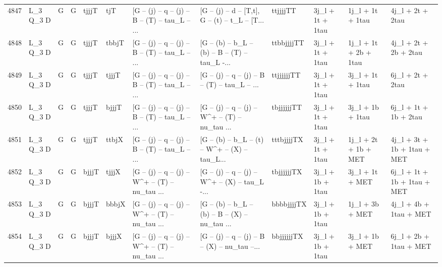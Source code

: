 \begin{tabular}{llllllllllll}
4847 &    L\_3 Q\_3 D &     G &     G &       tjjjT &         tjT &  [G -- (j) -- q -- (j) -- B -- (T) -- tau\_L -- ... &  [G -- (j) -- d -- [T,t], G -- (t) -- t\_L -- [T... &    ttjjjjTT &         3j\_l + 1t + 1tau &         1j\_l + 1t + 1tau &                   4j\_l + 2t + 2tau \\
4848 &    L\_3 Q\_3 D &     G &     G &       tjjjT &       tbbjT &  [G -- (j) -- q -- (j) -- B -- (T) -- tau\_L -- ... &  [G -- (b) -- b\_L -- (b) -- B -- (T) -- tau\_L -... &  ttbbjjjjTT &         3j\_l + 1t + 1tau &    1j\_l + 1t + 2b + 1tau &              4j\_l + 2t + 2b + 2tau \\
4849 &    L\_3 Q\_3 D &     G &     G &       tjjjT &       tjjjT &  [G -- (j) -- q -- (j) -- B -- (T) -- tau\_L -- ... &  [G -- (j) -- q -- (j) -- B -- (T) -- tau\_L -- ... &  ttjjjjjjTT &         3j\_l + 1t + 1tau &         3j\_l + 1t + 1tau &                   6j\_l + 2t + 2tau \\
4850 &    L\_3 Q\_3 D &     G &     G &       tjjjT &       bjjjT &  [G -- (j) -- q -- (j) -- B -- (T) -- tau\_L -- ... &  [G -- (j) -- q -- (j) -- W\textasciicircum + -- (T) -- nu\_tau ... &  tbjjjjjjTT &         3j\_l + 1t + 1tau &         3j\_l + 1b + 1tau &              6j\_l + 1t + 1b + 2tau \\
4851 &    L\_3 Q\_3 D &     G &     G &       tjjjT &       ttbjX &  [G -- (j) -- q -- (j) -- B -- (T) -- tau\_L -- ... &  [G -- (b) -- b\_L -- (t) -- W\textasciicircum + -- (X) -- tau\_L... &  tttbjjjjTX &         3j\_l + 1t + 1tau &     1j\_l + 2t + 1b + MET &        4j\_l + 3t + 1b + 1tau + MET \\
4852 &    L\_3 Q\_3 D &     G &     G &       bjjjT &       tjjjX &  [G -- (j) -- q -- (j) -- W\textasciicircum + -- (T) -- nu\_tau ... &  [G -- (j) -- q -- (j) -- W\textasciicircum + -- (X) -- tau\_L -... &  tbjjjjjjTX &         3j\_l + 1b + 1tau &          3j\_l + 1t + MET &        6j\_l + 1t + 1b + 1tau + MET \\
4853 &    L\_3 Q\_3 D &     G &     G &       bjjjT &       bbbjX &  [G -- (j) -- q -- (j) -- W\textasciicircum + -- (T) -- nu\_tau ... &  [G -- (b) -- b\_L -- (b) -- B -- (X) -- nu\_tau ... &  bbbbjjjjTX &         3j\_l + 1b + 1tau &          1j\_l + 3b + MET &             4j\_l + 4b + 1tau + MET \\
4854 &    L\_3 Q\_3 D &     G &     G &       bjjjT &       bjjjX &  [G -- (j) -- q -- (j) -- W\textasciicircum + -- (T) -- nu\_tau ... &  [G -- (j) -- q -- (j) -- B -- (X) -- nu\_tau --... &  bbjjjjjjTX &         3j\_l + 1b + 1tau &          3j\_l + 1b + MET &             6j\_l + 2b + 1tau + MET \\

\end{tabular}
